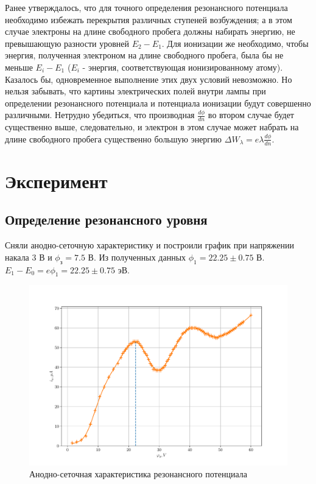 {Ранее утверждалось, что для точного определения резонансного потенциала необходимо избежать перекрытия различных ступеней возбуждения; а в этом случае электроны на длине свободного пробега должны набирать энергию, не превышающую разности уровней $E_2-E_1$. Для ионизации же необходимо, чтобы энергия, полученная электроном на длине свободного пробега, была бы не меньше $E_i-E_1$ ($E_i$ - энергия, соответствующая ионизированному атому). Казалось бы, одновременное выполнение этих двух условий невозможно. Но нельзя забывать, что картины электрических полей внутри лампы при определении резонансного потенциала и потенциала ионизации будут совершенно различными. Нетрудно убедиться, что производная $\displaystyle\frac{d\phi}{dn}$ во втором случае будет существенно выше, следовательно, и электрон в этом случае может набрать на длине свободного пробега существенно большую энергию $\displaystyle\Delta W_\lambda = e\lambda \frac{d\phi}{dn}$.

\section{Эксперимент}
\subsection{Определение резонансного уровня}
Сняли анодно-сеточную характеристику и построили график при напряжении накала 3 В и $\phi_\text{з}=7.5$ В. Из полученных данных $\phi_1=22.25\pm 0.75$ В. $E_1-E_0=e\phi_1=22.25\pm 0.75$ эВ.
\begin{figure}[!h]
	\vspace{-15pt}
	\centering
	\includegraphics[width=\linewidth]{experiment/Fr-Hz1.pdf}
	\caption{Анодно-сеточная характеристика резонансного потенциала}
	\label{fig1}
\end{figure}
}
